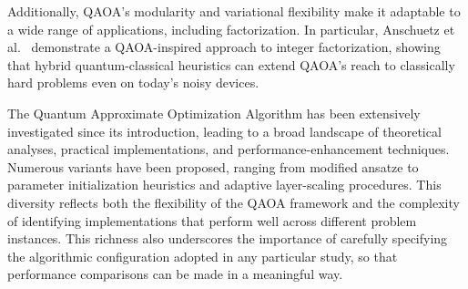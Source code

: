 Additionally, QAOA's modularity and variational flexibility make it adaptable to a wide range of applications, including factorization. In particular, Anschuetz et al.~\cite{anschuetz_variational_2018} demonstrate a QAOA-inspired approach to integer factorization, showing that hybrid quantum-classical heuristics can extend QAOA's reach to classically hard problems even on today's noisy devices.

The Quantum Approximate Optimization Algorithm has been extensively investigated since its introduction, leading to a broad landscape of theoretical analyses, practical  implementations, and performance-enhancement techniques. Numerous variants have been proposed, ranging from modified ansatze to parameter initialization heuristics and adaptive layer-scaling procedures. This diversity reflects both the flexibility of the QAOA framework and the complexity of identifying implementations that perform well across different problem instances. This richness also underscores the importance of carefully specifying the algorithmic configuration adopted in any particular study, so that performance comparisons can be made in a meaningful way.